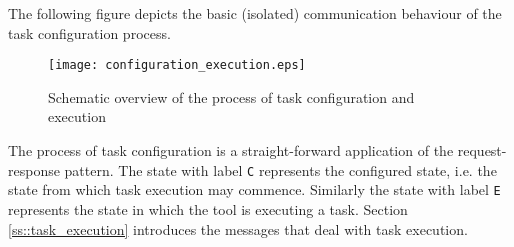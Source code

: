\documentclass{article}
\begin{document}
   The following figure depicts the basic (isolated) communication behaviour of
   the task configuration process.
   
   \begin{figure}[H]
    \begin{center}
     \texttt{[image: configuration\_execution.eps]}
    \end{center}
    \vspace{-0.3cm}
    \label{fig:configuration_execution}
    \caption{Schematic overview of the process of task configuration and execution}
   \end{figure}

   The process of task configuration is a straight-forward application of the
   request-response pattern. The state with label \texttt{C} represents the
   configured state, i.e. the state from which task execution may commence.
   Similarly the state with label \texttt{E} represents the state in which the
   tool is executing a task. Section \ref{ss::task_execution} introduces the
   messages that deal with task execution.

   
\end{document}
